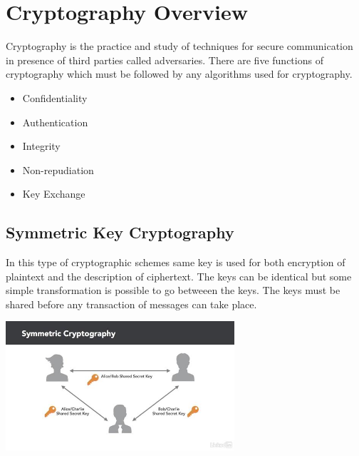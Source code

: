 \documentclass[conference]{IEEEtran}
\begin{document}
\section{Cryptography Overview}
\begin{flushleft}
Cryptography is the practice and study of techniques for secure communication in presence of third parties called adversaries.
\linebreak
There are five functions of cryptography which must be followed by any algorithms used for cryptography.
\begin{itemize}
  \item Confidentiality
  \item Authentication
  \item Integrity
  \item Non-repudiation
  \item Key Exchange
\end{itemize}
\end{flushleft}

\subsection{Symmetric Key Cryptography}
\begin{flushleft}
In this type of cryptographic schemes same key is used for both encryption of plaintext and the description of ciphertext. The keys can be identical but some simple transformation is possible to go betweeen the keys. The keys must be shared before any transaction of messages can take place.
\linebreak

\includegraphics[width=8.5cm]{symmetric}
\end{flushleft}
\end{document}
